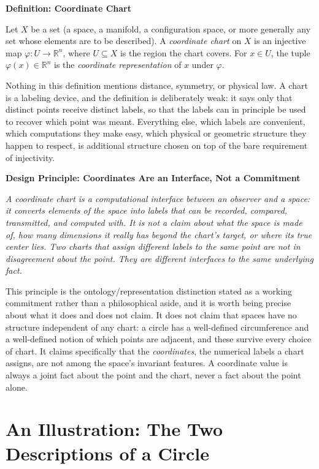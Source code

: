 \documentclass[11pt,fleqn]{book}
\numberwithin{equation}{chapter}
\newenvironment{definition}[1]
  {\begin{definitionEnv}
   \noindent\textbf{Definition: #1}\par\smallskip}
  {\end{definitionEnv}}
\newenvironment{principle}[1]
  {\begin{principleEnv}
   \noindent\textbf{Design Principle: #1}\par\smallskip\itshape}
  {\end{principleEnv}}
\theoremstyle{plain}
\theoremstyle{definition}
\theoremstyle{remark}
\newcommand{\R}{\mathbb{R}}
\begin{document}
\begin{definition}{Coordinate Chart}
Let \(X\) be a set (a space, a manifold, a configuration space, or more generally any set whose elements are to be described). A \emph{coordinate chart} on \(X\) is an injective map \(\varphi: U \to \R^n\), where \(U\subseteq X\) is the region the chart covers. For \(x\in U\), the tuple \(\varphi(x)\in\R^n\) is the \emph{coordinate representation} of \(x\) under \(\varphi\).
\end{definition}

Nothing in this definition mentions distance, symmetry, or physical law. A chart is a labeling device, and the definition is deliberately weak: it says only that distinct points receive distinct labels, so that the labels can in principle be used to recover which point was meant. Everything else, which labels are convenient, which computations they make easy, which physical or geometric structure they happen to respect, is additional structure chosen on top of the bare requirement of injectivity.

\begin{principle}{Coordinates Are an Interface, Not a Commitment}
A coordinate chart is a computational interface between an observer and a space: it converts elements of the space into labels that can be recorded, compared, transmitted, and computed with. It is not a claim about what the space is made of, how many dimensions it \emph{really} has beyond the chart's target, or where its \emph{true} center lies. Two charts that assign different labels to the same point are not in disagreement about the point. They are different interfaces to the same underlying fact.
\end{principle}

This principle is the ontology/representation distinction stated as a working commitment rather than a philosophical aside, and it is worth being precise about what it does and does not claim. It does not claim that spaces have no structure independent of any chart: a circle has a well-defined circumference and a well-defined notion of which points are adjacent, and these survive every choice of chart. It claims specifically that the \emph{coordinates}, the numerical labels a chart assigns, are not among the space's invariant features. A coordinate value is always a joint fact about the point and the chart, never a fact about the point alone.

\section{An Illustration: The Two Descriptions of a Circle}
\end{document}

